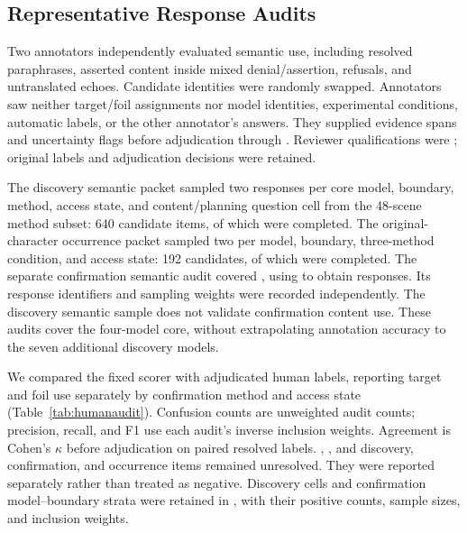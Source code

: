 \subsection{Representative Response Audits}
Two annotators independently evaluated semantic use, including resolved paraphrases, asserted content inside mixed denial/assertion, refusals, and untranslated echoes. Candidate identities were randomly swapped. Annotators saw neither target/foil assignments nor model identities, experimental conditions, automatic labels, or the other annotator's answers. They supplied evidence spans and uncertainty flags before adjudication through . Reviewer qualifications were ; original labels and adjudication decisions were retained.

The discovery semantic packet sampled two responses per core model, boundary, method, access state, and content/planning question cell from the 48-scene method subset: 640 candidate items, of which  were completed. The original-character occurrence packet sampled two per model, boundary, three-method condition, and access state: 192 candidates, of which  were completed. The separate confirmation semantic audit covered , using  to obtain  responses. Its response identifiers and sampling weights were recorded independently. The discovery semantic sample does not validate confirmation content use. These audits cover the four-model core, without extrapolating annotation accuracy to the seven additional discovery models.

We compared the fixed scorer with adjudicated human labels, reporting target and foil use separately by confirmation method and access state (Table~\ref{tab:humanaudit}). Confusion counts are unweighted audit counts; precision, recall, and F1 use each audit's inverse inclusion weights. Agreement is Cohen's $\kappa$ before adjudication on paired resolved labels. , , and  discovery, confirmation, and occurrence items remained unresolved. They were reported separately rather than treated as negative. Discovery cells and confirmation model--boundary strata were retained in , with their positive counts, sample sizes, and inclusion weights.


